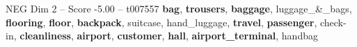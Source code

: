 \begin{textsample}{NEG Dim 2 – Score -5.00 – t007557}  \label{ex:f2_neg_006}
\textbf{bag}, \textbf{trousers}, \textbf{baggage}, luggage\_\&\_bags, \textbf{flooring}, \textbf{floor}, \textbf{backpack}, suitcase, hand\_luggage, \textbf{travel}, \textbf{passenger}, check-in, \textbf{cleanliness}, \textbf{airport}, \textbf{customer}, \textbf{hall}, \textbf{airport\_terminal}, handbag

\end{textsample}

